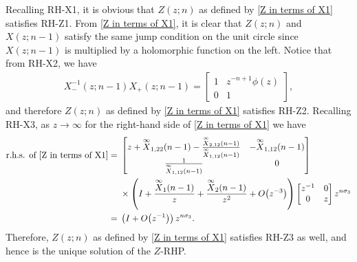 \documentclass[10pt,a4paper]{amsart}
\numberwithin{equation}{section}
\newcommand{\di}{\displaystyle}
\begin{document}
	Recalling {\rm RH-X1}, it is obvious that $Z(z;n)$ as defined by \eqref{Z in terms of X1} satisfies {\rm RH-Z1}. From \eqref{Z in terms of X1}, it is clear that $Z(z;n)$ and $X(z;n-1)$ satisfy the same jump condition on the unit circle since~${X(z;n-1)}$ is multiplied by a holomorphic function on the left. Notice that from {\rm RH-X2}, we have
	\begin{equation*}
		\begin{split}
			X^{-1}_-(z;n-1)X_+(z;n-1) = \begin{bmatrix}
				1 & z^{-n+1}\phi(z) \\
				0 & 1
			\end{bmatrix},
		\end{split}
	\end{equation*}
	and therefore $Z(z;n)$ as defined by \eqref{Z in terms of X1} satisfies {\rm RH-Z2}. Recalling {\rm RH-X3}, as $z \to \infty$ for the right-hand side of \eqref{Z in terms of X1} we have
	\begin{align*}%
			\text{r.h.s. of \eqref{Z in terms of X1}} ={}&
			\begin{bmatrix}
				z + \overset{\infty}{X}_{1,22}(n-1) - \tfrac{\overset{\infty}{X}_{2,12}(n-1)}{\overset{\infty}{X}_{1,12}(n-1)} & -\overset{\infty}{X}_{1,12}(n-1) \\
				\tfrac{1}{\overset{\infty}{X}_{1,12}(n-1)} & 0
			\end{bmatrix} \\ & \times \left(\di I+\frac{ \overset{\infty}{X}_1(n-1)}{z}+\frac{\overset{\infty}{X}_2(n-1)}{z^2} + O\big(z^{-3}\big)\right) \begin{bmatrix}
				z^{-1} & 0 \\
				0 & z
			\end{bmatrix} z^{n \sigma_3} \\ ={}& \left( I + O\big(z^{-1}\big) \right) z^{n \sigma_3}.
	\end{align*}
	Therefore, $Z(z;n)$ as defined by \eqref{Z in terms of X1} satisfies {\rm RH-Z3} as well, and hence is the unique solution of the $Z$-RHP.
	
\end{document}
